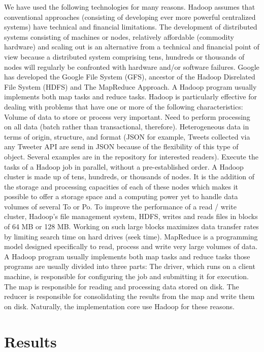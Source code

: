 \documentclass{acmtog} %
\begin{document}
We have used the following technologies for many reasons. Hadoop assumes that conventional approaches (consisting of developing ever more powerful centralized systems) have technical and financial limitations. The development of distributed systems consisting of machines or nodes, relatively affordable (commodity hardware) and scaling out is an alternative from a technical and financial point of view because a distributed system comprising tens, hundreds or thousands of nodes will regularly be confronted with hardware and/or software failures. Google has developed the Google File System (GFS), ancestor of the Hadoop Disrelated File System (HDFS) and The MapReduce Approach. A Hadoop program usually implements both map tasks and reduce tasks. Hadoop is particularly effective for dealing with problems that have one or more of the following characteristics: Volume of data to store or process very important. Need to perform processing on all data (batch rather than transactional, therefore). Heterogeneous data in terms of origin, structure, and format (JSON for example, Tweets collected via any Tweeter API are send in JSON because of the flexibility of this type of object. Several examples are in the repository for interested readers). Execute the tasks of a Hadoop job in parallel, without a pre-established order. A Hadoop cluster is made up of tens, hundreds, or thousands of nodes. It is the addition of the storage and processing capacities of each of these nodes which makes it possible to offer a storage space and a computing power yet to handle data volumes of several To or Po. To improve the performance of a read / write cluster, Hadoop’s file management system, HDFS, writes and reads files in blocks of 64 MB or 128 MB. Working on such large blocks maximizes data transfer rates by limiting search time on hard drives (seek time). MapReduce is a programming model designed specifically to read, process and write very large volumes of data. A Hadoop program usually implements both map tasks and reduce tasks those programs are usually divided into three parts: The driver, which runs on a client machine, is responsible for configuring the job and submitting it for execution. The map is responsible for reading and processing data stored on disk. The reducer is responsible for consolidating the results from the map and write them on disk. Naturally, the implementation core use Hadoop for these reasons.

\section{Results}
\label{sub:results}
\end{document}

